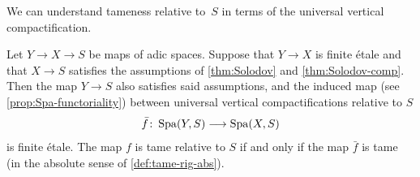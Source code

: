 We can understand tameness relative to~$S$ in terms of the universal vertical compactification.

\begin{prop} \label{prop:tame-S-compactification}
    Let $Y\to X\to S$ be maps of adic spaces.
    Suppose that $Y\to X$ is finite \'etale and that $X\to S$ satisfies the assumptions of \cref{thm:Solodov} and \cref{thm:Solodov-comp}. Then the map $Y\to S$ also satisfies said assumptions, and the induced map (see \cref{prop:Spa-functoriality}) between universal vertical compactifications relative to $S$
        \[ 
            \bar{f}\colon \operatorname{Spa}(Y,S)\longrightarrow \operatorname{Spa}(X,S)
        \]
    is finite \'etale. The map $f$ is tame relative to $S$ if and only if the map $\bar{f}$ is tame (in the absolute sense of \cref{def:tame-rig-abs}).
\end{prop}

